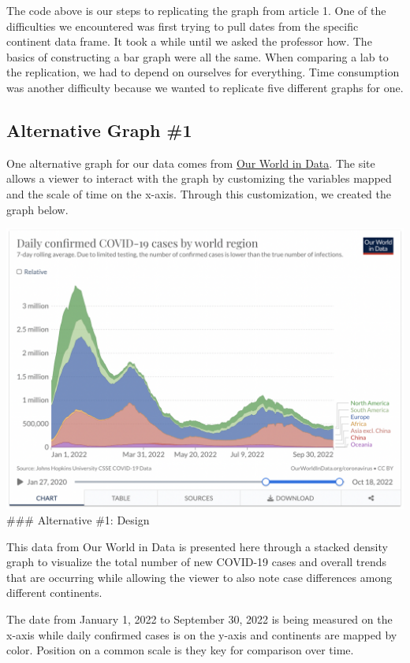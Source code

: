 \documentclass[
]{article}
\begin{document}
The code above is our steps to replicating the graph from article 1. One
of the difficulties we encountered was first trying to pull dates from
the specific continent data frame. It took a while until we asked the
professor how. The basics of constructing a bar graph were all the same.
When comparing a lab to the replication, we had to depend on ourselves
for everything. Time consumption was another difficulty because we
wanted to replicate five different graphs for one.

\hypertarget{alternative-graph-1}{%
\subsection{Alternative Graph \#1}\label{alternative-graph-1}}

One alternative graph for our data comes from
\href{https://ourworldindata.org/grapher/daily-cases-covid-region?time=2022-01-01..2022-09-30}{Our
World in Data}. The site allows a viewer to interact with the graph by
customizing the variables mapped and the scale of time on the x-axis.
Through this customization, we created the graph below.

\includegraphics[width=22.33in]{original_graphs/our_world_in_data_graphic}
\#\#\# Alternative \#1: Design

This data from Our World in Data is presented here through a stacked
density graph to visualize the total number of new COVID-19 cases and
overall trends that are occurring while allowing the viewer to also note
case differences among different continents.

The date from January 1, 2022 to September 30, 2022 is being measured on
the x-axis while daily confirmed cases is on the y-axis and continents
are mapped by color. Position on a common scale is they key for
comparison over time.
\end{document}
